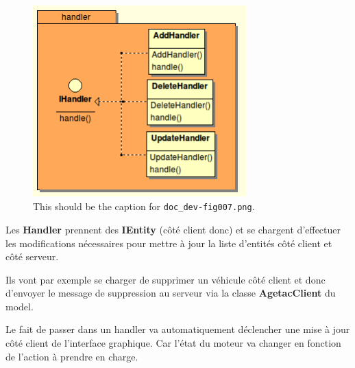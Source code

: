 \documentclass{article}
\begin{document}
\begin{figure}[htbp]
\begin{center}
\includegraphics[width=233pt, height=209pt]{doc_dev-fig007.png}
\caption{This should be the caption for \texttt{doc\_dev-fig007.png}.}
\end{center}
\end{figure}

\vspace{13pt}
{\color{color01} Les }{\color{color01} \textbf{Handler}}{\color{color01}  prennent 
des }{\color{color01} \textbf{IEntity}}{\color{color01}  (côté client donc) et 
se chargent d'effectuer les modifications nécessaires pour mettre à jour la liste 
d'entités côté client et côté serveur.}

{\color{color01} Ils vont par exemple se charger de supprimer un véhicule côté 
client et donc d'envoyer le message de suppression au serveur via la classe }{\color{color01} \textbf{AgetacClient}}{\color{color01}  
du model.}

{\color{color01} Le fait de passer dans un handler va automatiquement déclencher 
une mise à jour côté client de l'interface graphique. Car l'état du moteur 
va changer en fonction de l'action à prendre en charge.}
\end{document}
